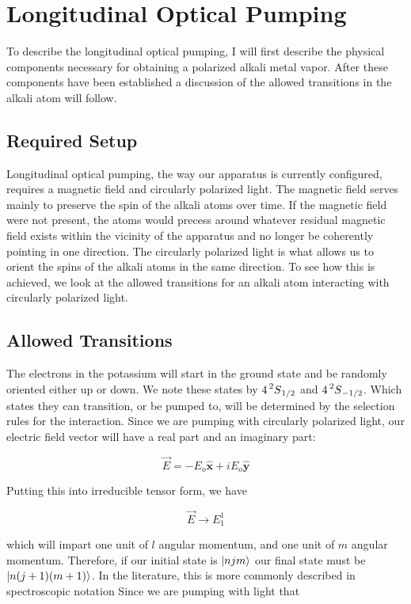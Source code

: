 \documentclass[12pt]{article}
\newcommand{\xhat}{\hat{\textbf{x}}}
\newcommand{\yhat}{\hat{\textbf{y}}}
\begin{document}
\section{Longitudinal Optical Pumping}
To describe the longitudinal optical pumping, I will
first describe the physical components necessary for
obtaining a polarized alkali metal vapor. After these 
components have been established a discussion of the 
allowed transitions in the alkali atom will follow. 
	\subsection{Required Setup}
    Longitudinal optical pumping, the way our apparatus is 
    currently configured, requires a magnetic field and
    circularly polarized light. The magnetic field
	serves mainly to preserve the spin of the alkali
	atoms over time. If the magnetic field were not 
	present, the atoms would precess around whatever
	residual magnetic field exists within the vicinity
	of the apparatus and no longer be coherently pointing
	in one direction. The circularly polarized light
	is what allows us to orient the spins of the alkali
	atoms in the same direction. To see how this is
	achieved, we look at the allowed transitions for
	an alkali atom interacting with circularly polarized
	light. 

	\subsection{Allowed Transitions}
	The electrons in the potassium will start in the ground
	state and be randomly oriented either up or down.
	We note these states by $4\prescript{2}{}S_{1/2}$ and 
	$4\prescript{2}{}S_{-1/2}$. 
	Which states they can transition, or be pumped to, 
	will be determined by the selection
	rules for the interaction. Since we are pumping with
	circularly polarized light, our electric field vector
	will have a real part and an imaginary part:
	
	\begin{equation}
		\vec{E}=-E_o \xhat  +iE_o \yhat 
	\end{equation}

	Putting this into irreducible tensor form, we have 

	\begin{equation}
		\vec{E} \rightarrow E_1^1
	\end{equation}

	which will impart one unit of $l$ angular momentum,
	and one unit of $m$ angular momentum. Therefore, if
	our initial state is $\ket{njm}$ our final state must
	be $\ket{n(j+1)(m+1)}$. In the literature, this is more
	commonly described in spectroscopic notation 
	Since we are pumping with light that 
\end{document}
